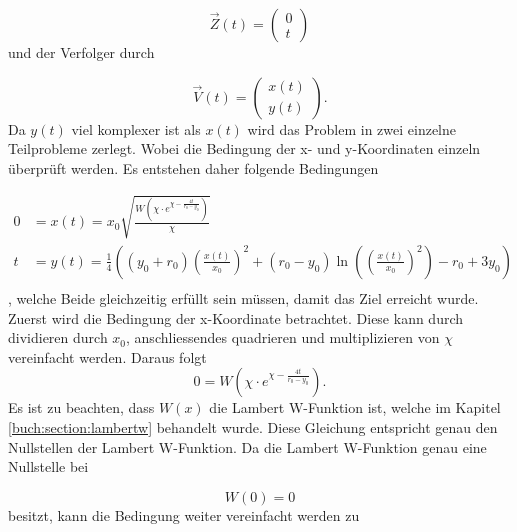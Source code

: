 \begin{equation}
    \vec{Z}(t)
    =
    \left( \begin{array}{c} 0 \\ t \end{array} \right)
\end{equation}
%
und der Verfolger durch

\begin{equation}
    \vec{V}(t)
    =
    \left( \begin{array}{c} x(t) \\ y(t) \end{array} \right)
    \text{.}
\end{equation}
%
 Da $y(t)$ viel komplexer ist als $x(t)$ wird das Problem in zwei einzelne Teilprobleme zerlegt. Wobei die Bedingung der x- und y-Koordinaten einzeln überprüft werden. Es entstehen daher folgende Bedingungen

\begin{align*}
    0
    &=
    x(t)
    =
    x_0\sqrt{\frac{W\left(\chi\cdot e^{\chi-\frac{4t}{r_0-y_0}}\right)}{\chi}}
    \\
    t
    &=
    y(t)
    =
    \frac{1}{4}\left(\left(y_0+r_0\right)\left(\frac{x(t)}{x_0}\right)^2+\left(r_0-y_0\right)\operatorname{ln}\left(\left(\frac{x(t)}{x_0}\right)^2\right)-r_0+3y_0\right)
    \\
\end{align*}
%
, welche Beide gleichzeitig erfüllt sein müssen, damit das Ziel erreicht wurde.
Zuerst wird die Bedingung der x-Koordinate betrachtet.
Diese kann durch dividieren durch $x_0$, anschliessendes quadrieren und multiplizieren von $\chi$ vereinfacht werden. Daraus folgt 
\begin{equation}
	0
	=
	W\left(\chi\cdot e^{\chi-\frac{4t}{r_0-y_0}}\right)
	\text{.}
\end{equation}
%
Es ist zu beachten, dass $W(x)$ die Lambert W-Funktion ist, welche im Kapitel  \eqref{buch:section:lambertw} behandelt wurde.
Diese Gleichung entspricht genau den Nullstellen der Lambert W-Funktion. Da die Lambert W-Funktion genau eine Nullstelle bei

\begin{equation*}
    W(0)=0
\end{equation*}
%
besitzt, kann die Bedingung weiter vereinfacht werden zu

